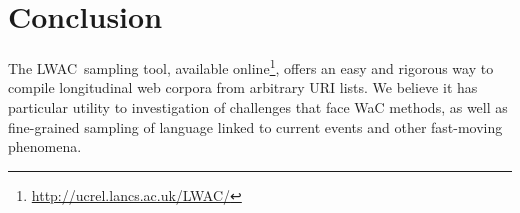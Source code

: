 \documentclass[11pt]{article}
\newcommand{\toolname}{LWAC}
\begin{document}


\section{Conclusion}
The \toolname~sampling tool, available online\footnote{\url{http://ucrel.lancs.ac.uk/LWAC/}}, offers an easy and rigorous way to compile longitudinal web corpora from arbitrary URI lists.  We believe it has particular utility to investigation of challenges that face WaC methods, as well as fine-grained sampling of language linked to current events and other fast-moving phenomena.

\vspace{-12pt}



\end{document}

